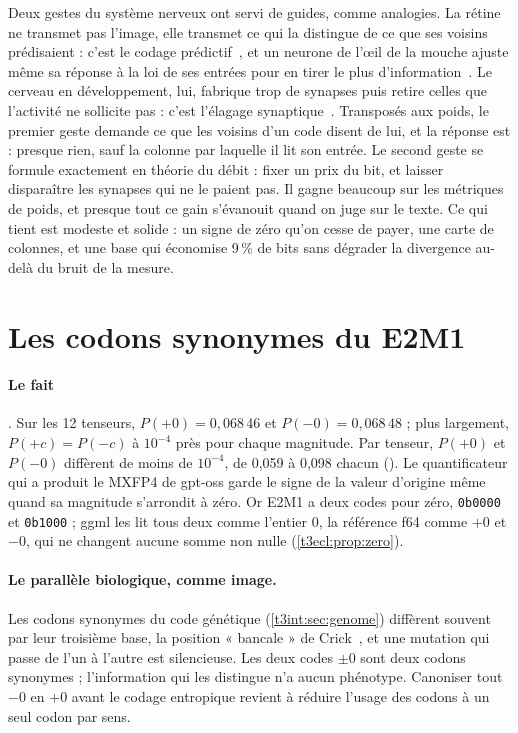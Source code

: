 \begin{enbref}
Deux gestes du système nerveux ont servi de guides, comme analogies. La rétine ne transmet pas l'image, elle transmet ce qui la distingue de ce que ses voisins prédisaient : c'est le codage prédictif~\cite{rao1999}, et un neurone de l'œil de la mouche ajuste même sa réponse à la loi de ses entrées pour en tirer le plus d'information~\cite{genome-pe-laughlin1981}. Le cerveau en développement, lui, fabrique trop de synapses puis retire celles que l'activité ne sollicite pas : c'est l'élagage synaptique~\cite{huttenlocher1979}. Transposés aux poids, le premier geste demande ce que les voisins d'un code disent de lui, et la réponse est : presque rien, sauf la colonne par laquelle il lit son entrée. Le second geste se formule exactement en théorie du débit : fixer un prix du bit, et laisser disparaître les synapses qui ne le paient pas. Il gagne beaucoup sur les métriques de poids, et presque tout ce gain s'évanouit quand on juge sur le texte. Ce qui tient est modeste et solide : un signe de zéro qu'on cesse de payer, une carte de colonnes, et une base qui économise 9\,\% de bits sans dégrader la divergence au-delà du bruit de la mesure.
\end{enbref}

\section{Les codons synonymes du E2M1}\label{t3pre:sec:codons}

\paragraph{Le fait} \mes. Sur les 12 tenseurs, $P(+0) = 0{,}068\,46$ et $P(-0) = 0{,}068\,48$ ; plus largement, $P(+c) = P(-c)$ à $10^{-4}$ près pour chaque magnitude. Par tenseur, $P(+0)$ et $P(-0)$ diffèrent de moins de $10^{-4}$, de 0,059 à 0,098 chacun (). Le quantificateur qui a produit le MXFP4 de gpt-oss garde le signe de la valeur d'origine même quand sa magnitude s'arrondit à zéro. Or E2M1 a deux codes pour zéro, \texttt{0b0000} et \texttt{0b1000} ; ggml les lit tous deux comme l'entier 0, la référence f64 comme $+0$ et $-0$, qui ne changent aucune somme non nulle (\cref{t3ecl:prop:zero}).

\paragraph{Le parallèle biologique, comme image.} Les codons synonymes du code génétique (\cref{t3int:sec:genome}) diffèrent souvent par leur troisième base, la position « bancale » de Crick~\cite{genome-pe-crick1966wobble}, et une mutation qui passe de l'un à l'autre est silencieuse. Les deux codes $\pm0$ sont deux codons synonymes ; l'information qui les distingue n'a aucun phénotype. Canoniser tout $-0$ en $+0$ avant le codage entropique revient à réduire l'usage des codons à un seul codon par sens.

